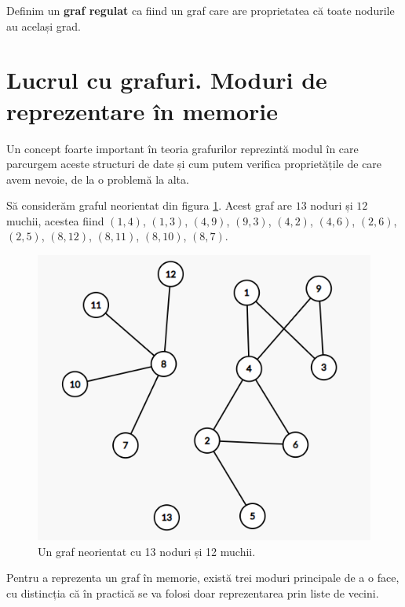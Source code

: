 \begin{definition}
    Definim un \textbf{graf regulat} ca fiind un graf care are proprietatea că toate nodurile au același grad. 
\end{definition}

\section{Lucrul cu grafuri. Moduri de reprezentare în memorie}

Un concept foarte important în teoria grafurilor reprezintă modul în care parcurgem aceste structuri de date și cum putem verifica proprietățile de care avem nevoie, de la o problemă la alta. 

Să considerăm graful neorientat din figura \ref{fig:graph}. Acest graf are $13$ noduri și $12$ muchii, acestea fiind $(1, 4)$, $(1, 3)$, $(4, 9)$, $(9, 3)$, $(4, 2)$, $(4, 6)$, $(2, 6)$, $(2, 5)$, $(8, 12)$, $(8, 11)$, $(8, 10)$, $(8, 7)$.

\begin{figure}[h!t!b]
\includegraphics[width=\textwidth]{images/grafuri/graph.png}
\caption{\label{fig:graph} Un graf neorientat cu 13 noduri și 12 muchii.}
\end{figure}



Pentru a reprezenta un graf în memorie, există trei moduri principale de a o face, cu distincția că în practică se va folosi doar reprezentarea prin liste de vecini.

